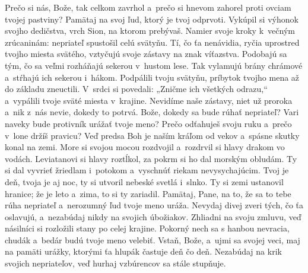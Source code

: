 Prečo si nás, Bože, tak celkom zavrhol
a~prečo si hnevom zahorel proti ovciam tvojej pastviny?
\versseparator
Pamätaj na svoj ľud,
ktorý je tvoj odprvoti.
\versseparator
Vykúpil si výhonok svojho dedičstva,
vrch Sion, na ktorom prebývaš.
\versseparator
Namier svoje kroky k~večným zrúcaninám:
nepriateľ spustošil celú svätyňu.
\versseparator
Tí, čo ťa nenávidia, ryčia
uprostred tvojho miesta svätého,
\versseparator
vztyčujú svoje zástavy na znak víťazstva.
Podobajú sa tým, čo sa veľmi rozháňajú sekerou
\versseparator
v~hustom lese.
Tak vylamujú brány chrámové
a~stŕhajú ich sekerou i~hákom.
\versseparator
Podpálili tvoju svätyňu,
príbytok tvojho mena až do základu zneuctili.
\versseparator
V~srdci si povedali: „Zničme ich všetkých odrazu,“
a~vypálili tvoje sväté miesta v~krajine.
\versseparator
Nevidíme naše zástavy,
niet už proroka
a~nik z~nás nevie, dokedy to potrvá.
\versseparator
Bože, dokedy sa bude rúhať nepriateľ?
Vari naveky bude protivník urážať tvoje meno?
\versseparator
Prečo odťahuješ svoju ruku
a~prečo v~lone držíš pravicu?
\versseparator
Veď predsa Boh je naším kráľom od vekov
a~spásne skutky konal na zemi.
\versseparator
More si svojou mocou rozdvojil
a~rozdrvil si hlavy drakom vo vodách.
\versseparator
Leviatanovi si hlavy roztĺkol,
za pokrm si ho dal morským obludám.
\versseparator
Ty si dal vyvrieť žriedlam i~potokom
a~vyschnúť riekam nevysychajúcim.
\versseparator
Tvoj je deň, tvoja je aj noc,
ty si utvoril nebeské svetlá i~slnko.
\versseparator
Ty si zemi ustanovil hranice;
že je leto a~zima, to si ty zariadil.
\versseparator
Pamätaj, Pane, na to,
že sa to tebe rúha nepriateľ
a~nerozumný ľud tvoje meno uráža.
\versseparator
Nevydaj divej zveri tých, čo ťa oslavujú,
a~nezabúdaj nikdy na svojich úbožiakov.
\versseparator
Zhliadni na svoju zmluvu,
veď násilníci si rozložili stany po celej krajine.
\versseparator
Pokorný nech sa s hanbou nevracia,
chudák a~bedár budú tvoje meno velebiť.
\versseparator
Vstaň, Bože, a~ujmi sa svojej veci,
maj na pamäti urážky,
ktorými ťa hlupák častuje deň čo deň.
\versseparator
Nezabúdaj na krik svojich nepriateľov,
veď hurhaj vzbúrencov sa stále stupňuje.